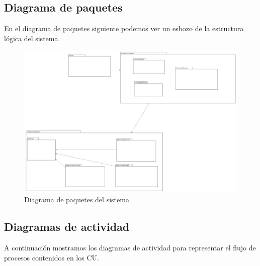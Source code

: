     \clearpage
    \subsection{Diagrama de paquetes}

   En el diagrama de paquetes siguiente podemos ver un esbozo de la estructura lógica del sistema.
      
    
    \begin{figure}[H] %
\centering
\includegraphics[scale=0.2]{imagenes/diagramas/diagrama_de_paquetes.png}  %

\caption{Diagrama de paquetes del sistema}\label{figura20}
\end{figure}

    
    
    \newpage
    
   \subsection{Diagramas de actividad}

A continuación mostramos los diagramas de actividad para representar el flujo de procesos contenidos en los CU.

